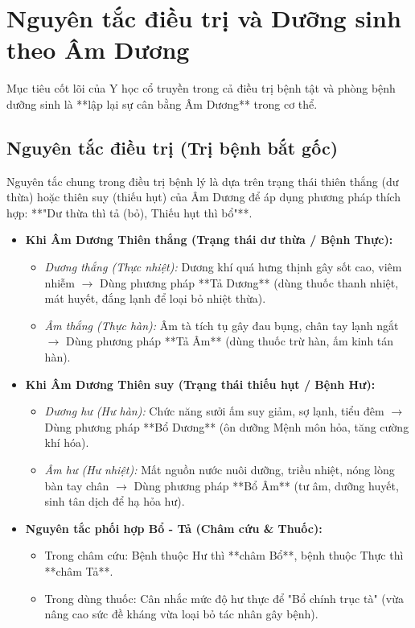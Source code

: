 \section{Nguyên tắc điều trị và Dưỡng sinh theo Âm Dương}

Mục tiêu cốt lõi của Y học cổ truyền trong cả điều trị bệnh tật và phòng bệnh dưỡng sinh là **lập lại sự cân bằng Âm Dương** trong cơ thể.

\subsection{Nguyên tắc điều trị (Trị bệnh bắt gốc)}

Nguyên tắc chung trong điều trị bệnh lý là dựa trên trạng thái thiên thắng (dư thừa) hoặc thiên suy (thiếu hụt) của Âm Dương để áp dụng phương pháp thích hợp: **"Dư thừa thì tả (bỏ), Thiếu hụt thì bổ"**.

\begin{itemize}
    \item \textbf{Khi Âm Dương Thiên thắng (Trạng thái dư thừa / Bệnh Thực):}
    \begin{itemize}
        \item \textit{Dương thắng (Thực nhiệt):} Dương khí quá hưng thịnh gây sốt cao, viêm nhiễm $\rightarrow$ Dùng phương pháp **Tả Dương** (dùng thuốc thanh nhiệt, mát huyết, đắng lạnh để loại bỏ nhiệt thừa).
        \item \textit{Âm thắng (Thực hàn):} Âm tà tích tụ gây đau bụng, chân tay lạnh ngắt $\rightarrow$ Dùng phương pháp **Tả Âm** (dùng thuốc trừ hàn, ấm kinh tán hàn).
    \end{itemize}

    \item \textbf{Khi Âm Dương Thiên suy (Trạng thái thiếu hụt / Bệnh Hư):}
    \begin{itemize}
        \item \textit{Dương hư (Hư hàn):} Chức năng sưởi ấm suy giảm, sợ lạnh, tiểu đêm $\rightarrow$ Dùng phương pháp **Bổ Dương** (ôn dưỡng Mệnh môn hỏa, tăng cường khí hóa).
        \item \textit{Âm hư (Hư nhiệt):} Mất nguồn nước nuôi dưỡng, triều nhiệt, nóng lòng bàn tay chân $\rightarrow$ Dùng phương pháp **Bổ Âm** (tư âm, dưỡng huyết, sinh tân dịch để hạ hỏa hư).
    \end{itemize}

    \item \textbf{Nguyên tắc phối hợp Bổ - Tả (Châm cứu \& Thuốc):}
    \begin{itemize}
        \item Trong châm cứu: Bệnh thuộc Hư thì **châm Bổ**, bệnh thuộc Thực thì **châm Tả**.
        \item Trong dùng thuốc: Cân nhắc mức độ hư thực để "Bổ chính trục tà" (vừa nâng cao sức đề kháng vừa loại bỏ tác nhân gây bệnh).
    \end{itemize}
\end{itemize}

